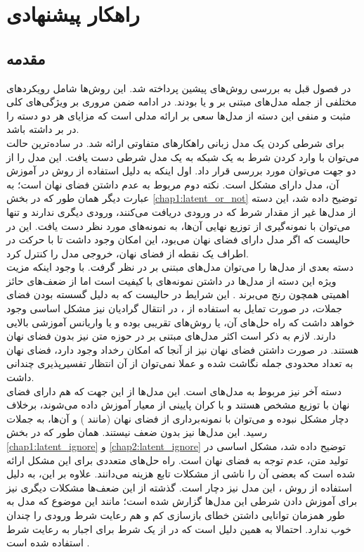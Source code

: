 \chapter{راهکار پیشنهادی}\label{chap3}
\minitoc

\section{مقدمه}
در فصول قبل به بررسی روش‌های پیشین پرداخته شد. این روش‌ها شامل رویکرد‌های مختلفی از جمله مدل‌های مبتنی بر \gan{} و یا \vae{} بودند. در ادامه ضمن مروری بر ویژگی‌های کلی مثبت و منفی این دسته از مدل‌ها سعی بر ارائه مدلی است که مزایای هر دو دسته را در بر داشته باشد.
\\
برای شرطی کردن یک مدل زبانی راهکارهای متفاوتی ارائه شد. در ساده‌ترین حالت می‌توان با وارد کردن شرط به یک شبکه  به یک مدل شرطی دست یافت. این مدل را از دو جهت می‌توان مورد بررسی قرار داد. اول اینکه به دلیل استفاده از روش \teacherforcing{} در آموزش آن، مدل دارای مشکل \expbias{} است. نکته دوم مربوط به عدم داشتن فضای نهان است؛ به عبارت دیگر همان طور که در بخش  \ref{chap1:latent_or_not} توضیح داده شد، این دسته از مدل‌ها غیر از مقدار شرط که در ورودی دریافت می‌کنند، ورودی دیگری ندارند و تنها می‌توان با نمونه‌گیری از توزیع نهایی آن‌ها، به نمونه‌های مورد نظر دست یافت. این در حالیست که اگر مدل دارای فضای نهان می‌بود، این امکان وجود داشت تا با حرکت در اطراف یک نقطه از فضای نهان، خروجی مدل را کنترل کرد.
\\
دسته بعدی از مدل‌ها را می‌توان مدل‌های مبتنی بر \gan{} در نظر گرفت. با وجود اینکه مزیت ویژه این دسته از مدل‌ها در داشتن  نمونه‌های با کیفیت است اما از ضعف‌های حائز اهمیتی همچون \modecollapse{} رنج می‌برند \cite{wgan}. این شرایط در حالیست که به دلیل گسسته بودن فضای جملات، در صورت تمایل به استفاده از \gan{}، در انتقال گرادیان نیز مشکل اساسی وجود خواهد داشت که راه حل‌های آن، یا روش‌های تقریبی بوده و یا واریانس آموزشی بالایی دارند. لازم به ذکر است اکثر مدل‌های مبتنی بر \gan{} در حوزه متن نیز بدون فضای نهان هستند. در صورت داشتن فضای نهان نیز از آنجا که امکان رخداد \modecollapse{} وجود دارد، فضای نهان به تعداد محدودی جمله نگاشت شده و عملا نمی‌توان از آن انتظار تفسیرپذیری چندانی داشت.
\\
دسته آخر نیز مربوط به مدل‌های \vae{} است. این مدل‌ها از این جهت که هم دارای فضای نهان با توزیع مشخص هستند و با کران پایینی از معیار \likelihood{} آموزش داده می‌شوند، برخلاف \gan{} دچار مشکل \modecollapse{} نبوده و می‌توان با نمونه‌برداری از فضای نهان (مانند \gan{}) و \decode{} آن‌ها، به جملات رسید. این مدل‌ها نیز بدون ضعف نیستند. همان طور که در بخش \ref{chap1:latent_ignore} و \ref{chap2:latent_ignore} توضیح داده شد، مشکل اساسی \vae{} در تولید متن، عدم توجه به فضای نهان است. راه حل‌های متعددی برای این مشکل ارائه شده است که بعضی آن را ناشی از مشکلات تابع هزینه می‌دانند. علاوه بر این، به دلیل استفاده از روش ‌\teacherforcing{}، این مدل نیز دچار \expbias{} است. گذشته از این ضعف‌ها مشکلات دیگری نیز برای آموزش دادن شرطی این مدل‌ها گزارش شده است؛ مانند این موضوع که مدل به طور همزمان توانایی داشتن خطای بازسازی کم و هم رعایت شرط ورودی را چندان خوب ندارد. احتمالا به همین دلیل است که در \towardctg{} از یک \classifier{} شرط برای اجبار \decoder{} به رعایت شرط استفاده شده است \cite{toward}.

